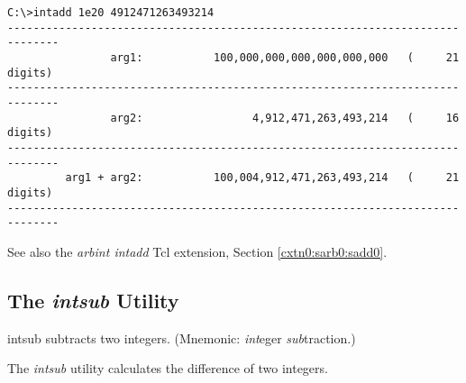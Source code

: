 \begin{dosutilcommandsampleinvocations}
\begin{scriptsize}
\begin{verbatim}
C:\>intadd 1e20 4912471263493214
------------------------------------------------------------------------------
                arg1:           100,000,000,000,000,000,000   (     21 digits)
------------------------------------------------------------------------------
                arg2:                 4,912,471,263,493,214   (     16 digits)
------------------------------------------------------------------------------
         arg1 + arg2:           100,004,912,471,263,493,214   (     21 digits)
------------------------------------------------------------------------------
\end{verbatim}
\end{scriptsize}
\end{dosutilcommandsampleinvocations}

\begin{dosutilcommandseealso}
See also the \emph{arbint intadd} Tcl extension, 
Section \ref{cxtn0:sarb0:sadd0}.
\end{dosutilcommandseealso}


\subsection{The \emph{intsub} Utility}
\label{cdcm0:sali0:ssub0}

\begin{dosutilcommandname}{intsub}%
subtracts two integers.  (Mnemonic:  \emph{int}eger
\emph{sub}traction.)
\end{dosutilcommandname}

\begin{dosutilcommandsynopsis}
\end{dosutilcommandsynopsis}

\begin{dosutilcommanddescription}
The \emph{intsub} utility calculates the difference of two integers.
\end{dosutilcommanddescription}

